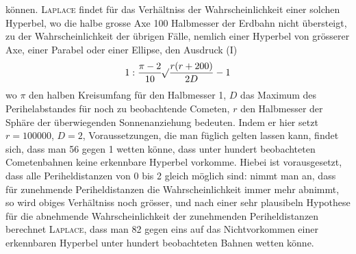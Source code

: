 können. \textsc{Laplace} findet für das Verhältniss der Wahrscheinlichkeit einer solchen Hyperbel, wo
die halbe grosse Axe 100 Halbmesser der Erdbahn nicht übersteigt, zu der Wahrscheinlichkeit der übrigen
Fälle, nemlich einer Hyperbel von grösserer Axe, einer Parabel oder einer Ellipse, den Ausdruck (I)
\[1 : \frac{\pi-2}{10}\mathord{{}^{}\!\surd}\frac{r(r+200)}{2D} - 1\]
wo $\pi$ den halben Kreisumfang für den Halbmesser 1, $D$ das Maximum des Perihelabstandes für noch zu
beobachtende Cometen, $r$ den Halbmesser der Sphäre der überwiegenden Sonnenanziehung bedeuten. Indem
er hier setzt $r = 100000$, $D = 2$, Voraussetzungen, die man füglich gelten lassen kann, findet sich, dass
man 56 gegen 1 wetten könne, dass unter hundert beobachteten Cometenbahnen keine erkennbare Hyperbel
vorkomme. Hiebei ist vorausgesetzt, dass alle Periheldistanzen von 0 bis 2 gleich möglich sind: nimmt man
an, dass für zunehmende Periheldistanzen die Wahrscheinlichkeit immer mehr abnimmt, so wird obiges
Verhältniss noch grösser, und nach einer sehr plausibeln Hypothese für die abnehmende Wahrscheinlichkeit
der zunehmenden Periheldistanzen berechnet \textsc{Laplace}, dass man 82 gegen eins auf das Nichtvorkommen
einer erkennbaren Hyperbel unter hundert beobachteten Bahnen wetten könne.

